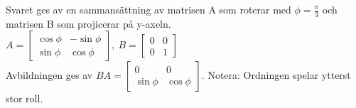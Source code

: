 Svaret ges av en sammansättning av matrisen A som roterar med $\phi=\frac{\pi}{3}$ och matrisen B som projicerar på y-axeln.\\ 
$A=\begin{bmatrix}\cos{\phi}&-\sin{\phi}\\\sin{\phi}&\cos{\phi}\end{bmatrix},\ B=\begin{bmatrix}0&0\\0&1\end{bmatrix}$ \\ 
Avbildningen ges av $BA=\begin{bmatrix}0&0\\\sin{\phi}&\cos{\phi}\end{bmatrix}$. Notera: Ordningen spelar ytterst stor roll.